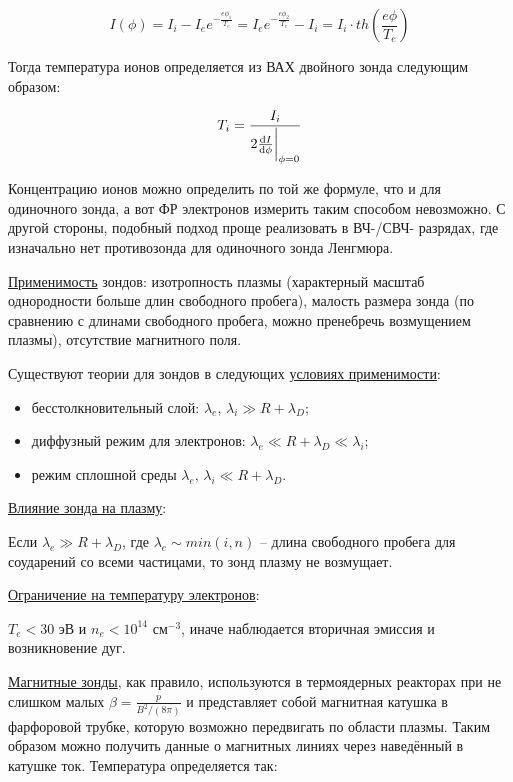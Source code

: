 \documentclass[10pt, a4paper]{article}
\begin{document}
\begin{equation*}
	I(\phi) = I_i - I_e e^{-\frac{e\phi_1}{T_e}} = I_e e^{-\frac{e\phi_2}{T_e}} - I_i = I_i\cdot th\left(\frac{e\phi}{T_e}\right)
\end{equation*}

Тогда температура ионов определяется из ВАХ двойного зонда следующим образом:

\begin{equation*}
	T_i = \frac{I_i}{2 \dv{I}{\phi}\bigg|_{\phi=0}}
\end{equation*}

Концентрацию ионов можно определить по той же формуле, что и для одиночного зонда, а вот ФР электронов измерить таким способом невозможно. С другой стороны, подобный подход проще реализовать в ВЧ-/СВЧ- разрядах, где изначально нет противозонда для одиночного зонда Ленгмюра.

\uline{Применимость} зондов: изотропность плазмы (характерный масштаб однородности больше длин свободного пробега), малость размера зонда (по сравнению с длинами свободного пробега, можно пренебречь возмущением плазмы), отсутствие магнитного поля.

Существуют теории для зондов в следующих \uline{условиях применимости}:

\begin{itemize}
	\item бесстолкновительный слой: $\lambda_e,\,\lambda_i\gg R+\lambda_D$;
	\item диффузный режим для электронов: $\lambda_e\ll R+\lambda_D \ll \lambda_i$;
	\item режим сплошной среды $\lambda_e,\,\lambda_i\ll R+\lambda_D$.
\end{itemize}

\uline{Влияние зонда на плазму}: 

Если $\lambda_e\gg R+\lambda_D$, где $\lambda_e \sim min(i, n)$ -- длина свободного пробега для соударений со всеми частицами, то зонд плазму не возмущает.

\uline{Ограничение на температуру электронов}:

$T_e<30$ эВ и $n_e<10^{14}$ см$^{-3}$, иначе наблюдается вторичная эмиссия и возникновение дуг.

\uline{Магнитные зонды}, как правило, используются в термоядерных реакторах при не слишком малых $\beta=\frac{p}{B^2/(8\pi)}$ и представляет собой магнитная катушка в фарфоровой трубке, которую возможно передвигать по области плазмы. Таким образом можно получить данные о магнитных линиях через наведённый в катушке ток. Температура определяется так:
\end{document}
